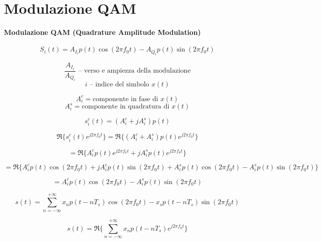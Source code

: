 
\section*{Modulazione QAM}



\paragraph*{Modulazione QAM (Quadrature Amplitude Modulation)}


\begin{equation*}
    S_i(t) = A_{I_i} p(t) \cos(2\pi f_0 t) - A_{Q_i} p(t) \sin(2\pi f_0 t)
\end{equation*}

\noindent
\begin{minipage}[c]{0.3\linewidth}

\end{minipage}%
\begin{minipage}[c]{0.7\linewidth}
    \begin{equation*}
        \frac{A_{I_i}}{A_{Q_i}} \text{ -- verso e ampiezza della modulazione}
    \end{equation*}
    \begin{equation*}
        i \text{ -- indice del simbolo } x(t)
    \end{equation*}
\end{minipage}




\[
    A^c_i = \text{componente in fase di } x(t)
\]
\[
    A^s_i = \text{componente in quadratura di } x(t)
\]

\[
    s^c_i(t) = (A^c_i + j A^s_i) p(t)
\]

\[
    \Re\{s^c_i(t) e^{j2\pi f_0t}\} = \Re\{(A^c_i + A^s_i) p(t) e^{j2\pi f_0t}\}
\]

\[
    = \Re\{A^c_i p(t) e^{j2\pi f_0t} + j A^s_i p(t) e^{j2\pi f_0t}\}
\]

\[
    = \Re\{A^c_i p(t) \cos(2\pi f_0t) + j A^c_i p(t) \sin(2\pi f_0t) + A^s_i p(t) \cos(2\pi f_0t) - A^s_i p(t) \sin(2\pi f_0t)\}
\]

\[
    = A^c_i p(t) \cos(2\pi f_0t) - A^s_i p(t) \sin(2\pi f_0t)
\]

\[
    s(t) = \sum_{n=-\infty}^{+\infty} x_n p(t-nT_s) \cos(2\pi f_0t) - x_s p(t-nT_s) \sin(2\pi f_0t)
\]

\[
    s(t) = \Re\{\sum_{n=-\infty}^{+\infty} x_n p(t-nT_s)e^{j2\pi f_0 t}\}
\]

